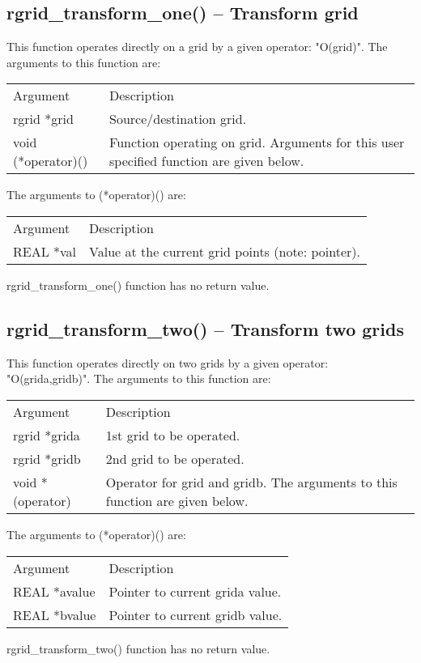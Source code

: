 \documentclass[12pt,letterpaper]{report}
\begin{document}
\subsection{rgrid\_transform\_one() -- Transform grid}

This function operates directly on a grid by a given operator:  "O(grid)". The arguments to this function are:
\begin{longtable}{p{} p{}}
Argument & Description\\
\cline{1-2}
rgrid *grid & Source/destination grid.\\
void (*operator)() & Function operating on grid. Arguments for this user specified function are given below.\\
\end{longtable}
The arguments to (*operator)() are:
\begin{longtable}{p{} p{}}
Argument & Description\\
\cline{1-2}
REAL *val & Value at the current grid points (note: pointer).\\
\end{longtable}
\noindent
rgrid\_transform\_one() function has no return value.

\subsection{rgrid\_transform\_two() -- Transform two grids}

This function operates directly on two grids by a given operator: "O(grida,gridb)". The arguments to this function are:
\begin{longtable}{p{} p{}}
Argument & Description\\
\cline{1-2}
rgrid *grida & 1st grid to be operated.\\
rgrid *gridb & 2nd grid to be operated.\\
void *(operator) & Operator for grid and gridb. The arguments to this function are given below.\\
\end{longtable}
\noindent
The arguments to (*operator)() are:
\begin{longtable}{p{} p{}}
Argument & Description\\
\cline{1-2}
REAL *avalue & Pointer to current grida value.\\
REAL *bvalue & Pointer to current gridb value.\\
\end{longtable}
\noindent
rgrid\_transform\_two() function has no return value.
\end{document}
